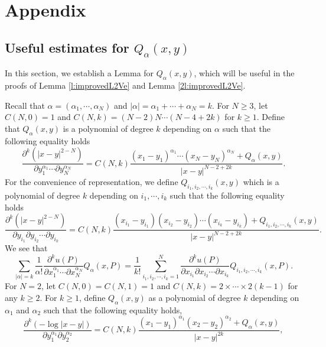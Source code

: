 \documentclass[11pt,reqno]{article}
\numberwithin{equation}{section}
\begin{document}
	\section{Appendix}\label{sec-appendix}
    \subsection{Useful estimates for $Q_\alpha(x,y)$}
    In this section, we establish a  Lemma for $Q_\alpha(x,y)$, which will be useful in the proofs of  Lemma \ref{l:improvedL2Ve} and Lemma \ref{2l:improvedL2Ve}. 
    
 Recall that $\alpha=(\alpha_1,\cdots,\alpha_N) $ and $|\alpha|=\alpha_1+\cdots+\alpha_N=k$. For $N\ge 3$, let $C(N,0)=1$ and  $C(N,k)=(N-2)N\cdots(N-4+2k)$ for $k\ge 1$. 
 Define that
 $Q_\alpha(x,y)$  is a polynomial of degree $k$ depending on $\alpha $  such that the following equality holds
				\begin{equation*}
					\frac{\partial^k\left(|x-y|^{2-N}\right)}{\partial y_1^{\alpha_1}\cdots\partial y_N^{\alpha_N}}=C(N,k)\frac{(x_1-y_1)^{\alpha_1}\cdots(x_N-y_N)^{\alpha_N}+Q_\alpha(x,y)}
					{|x-y|^{N-2+2k}}.
				\end{equation*}
              For the convenience of representation, we define 
             $Q_{i_1,i_2,\cdots,i_k}(x,y)$ which  is a polynomial of degree $k$ depending on $i_1,\cdots,i_k$ such that the following equality holds
                	\begin{equation}\label{eq10102025-4}
					\frac{\partial^k\left(|x-y|^{2-N}\right)}{\partial y_{i_1} \partial y_{i_2}\cdots \partial y_{i_k}}=C(N,k)\frac{(x_{i_1}-y_{i_1})(x_{i_2}-y_{i_2})\cdots (x_{i_k}-y_{i_k})+Q_{i_1,i_2,\cdots,i_k}(x,y)}
					{|x-y|^{N-2+2k}}.
				\end{equation}
	 We see that 
        \begin{equation}\label{eq2904}
               \sum_{|\alpha|=k}\frac1{\alpha!}
					\frac{\partial^ku(P)}{\partial x_1^{\alpha_1}\cdots\partial x_N^{\alpha_N}}Q_\alpha(x,P) =\frac{1}{k!}\sum_{i_1,i_2,\cdots,i_k=1}^{N}\frac{\partial^k u(P)}{\partial x_{i_1} \partial x_{i_2}\cdots \partial x_{i_k}}Q_{i_1,i_2,\cdots,i_k}(x,P).
        \end{equation}
          For $N=2$, let   $C(N,0)=C(N,1)=1$ and $C(N,k)=2\times\cdots\times2(k-1)$ for any $k\ge 2$. For $k\ge1$, define  $Q_\alpha(x,y)$ as a polynomial of degree $k$ depending  on $\alpha_1$ and $\alpha_2$ such that the following equality holds,
                    \begin{equation}
                        \frac{\partial^k(-\log|x-y|)}{\partial y_1^{\alpha_1}\partial y_2^{\alpha_2}} = C(N,k)\frac{(x_1 - y_1)^{\alpha_1}(x_2 - y_2)^{\alpha_2}+Q_\alpha(x,y)}{|x - y|^{2k}},
                    \end{equation}
\end{document}
